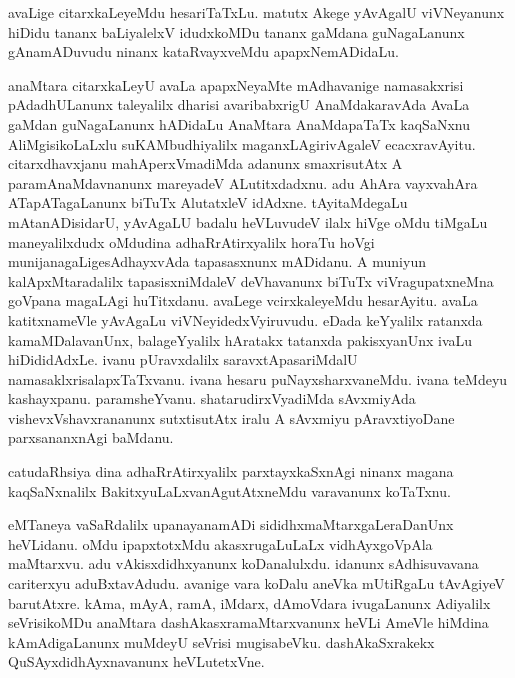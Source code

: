 \documentclass{article}
\begin{document}
\begin{mn}%
avaLige citarxkaLeyeMdu hesariTaTxLu. matutx Akege yAvAgalU viVNeyanunx hiDidu tananx 
baLiyalelxV idudxkoMDu tananx gaMdana  guNagaLanunx gAnamADuvudu ninanx kataRvayxveMdu 
apapxNemADidaLu.
\end{mn}

\begin{mn}%
anaMtara citarxkaLeyU avaLa apapxNeyaMte  mAdhavanige namasakxrisi pAdadhULanunx 
taleyalilx dharisi avaribabxrigU AnaMdakaravAda AvaLa gaMdan guNagaLanunx hADidaLu 
AnaMtara AnaMdapaTaTx kaqSaNxnu AliMgisikoLaLxlu suKAMbudhiyalilx maganxLAgirivAgaleV 
ecacxravAyitu. citarxdhavxjanu mahAperxVmadiMda adanunx smaxrisutAtx A paramAnaMdavnanunx 
mareyadeV ALutitxdadxnu. adu AhAra vayxvahAra ATapATagaLanunx biTuTx AlutatxleV idAdxne. 
tAyitaMdegaLu mAtanADisidarU, yAvAgaLU badalu heVLuvudeV ilalx hiVge oMdu tiMgaLu 
maneyalilxdudx  oMdudina adhaRrAtirxyalilx horaTu hoVgi munijanagaLigesAdhayxvAda 
tapasasxnunx mADidanu. A muniyun kalApxMtaradalilx tapasisxniMdaleV deVhavanunx biTuTx
viVragupatxneMna goVpana magaLAgi huTitxdanu. avaLege vcirxkaleyeMdu hesarAyitu. avaLa 
katitxnameVle yAvAgaLu viVNeyidedxVyiruvudu. eDada keYyalilx ratanxda kamaMDalavanUnx, 
balageYyalilx hAratakx tatanxda pakisxyanUnx ivaLu hiDididAdxLe. ivanu pUravxdalilx 
saravxtApasariMdalU namasaklxrisalapxTaTxvanu. ivana hesaru puNayxsharxvaneMdu. ivana 
teMdeyu kashayxpanu. paramsheYvanu. shatarudirxVyadiMda sAvxmiyAda vishevxVshavxrananunx 
sutxtisutAtx iralu A sAvxmiyu pAravxtiyoDane parxsananxnAgi baMdanu.
\end{mn}

\begin{mn}%
catudaRhsiya dina adhaRrAtirxyalilx parxtayxkaSxnAgi ninanx magana kaqSaNxnalilx 
BakitxyuLaLxvanAgutAtxneMdu varavanunx koTaTxnu.
\end{mn}

\begin{mn}%
eMTaneya vaSaRdalilx upanayanamADi sididhxmaMtarxgaLeraDanUnx heVLidanu. oMdu ipapxtotxMdu 
akasxrugaLuLaLx vidhAyxgoVpAla maMtarxvu. adu vAkisxdidhxyanunx koDanalulxdu. idanunx 
sAdhisuvavana  cariterxyu aduBxtavAdudu. avanige vara koDalu aneVka mUtiRgaLu tAvAgiyeV 
barutAtxre. kAma, mAyA, ramA, iMdarx, dAmoVdara ivugaLanunx Adiyalilx seVrisikoMDu anaMtara
dashAkasxramaMtarxvanunx heVLi AmeVle hiMdina kAmAdigaLanunx muMdeyU seVrisi mugisabeVku.
dashAkaSxrakekx QuSAyxdidhAyxnavanunx heVLutetxVne.
\end{mn}
\end{document}
